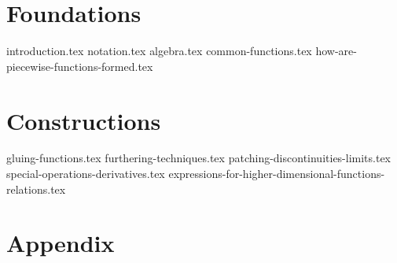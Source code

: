 \documentclass[10pt,a4paper]{article}
\begin{document}
\maketitle
\tableofcontents
\newpage

\part{Foundations}
{introduction.tex}
{notation.tex}
{algebra.tex}
{common-functions.tex}
{how-are-piecewise-functions-formed.tex}

\part{Constructions}
{gluing-functions.tex}
{furthering-techniques.tex}
{patching-discontinuities-limits.tex}
{special-operations-derivatives.tex}
{expressions-for-higher-dimensional-functions-relations.tex}

\part{Appendix}
\printglossary[title=Glossary, toctitle=Glossary]
\glsaddallunused
\end{document}
